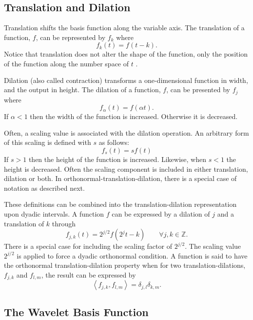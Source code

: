 \subsection {Translation and Dilation}

Translation shifts the basis function along the variable axis. The translation of a function, $f$, can be represented by $f_k$ where
\[
f_k(t) = f(t-k).
\]
Notice that translation does not alter the shape of the function, only the position of the function along the number space of $t$ \cite{translation}.

Dilation (also called contraction) transforms a one-dimensional function in width, and the output in height.   The dilation of a function, $f$, can be presented by $f_{j}$ where
\[
f_\alpha(t) = f(\alpha t).
\]
If $\alpha<1$ then the width of the function is increased. Otherwise it is decreased. 

Often, a scaling value is associated with the dilation operation.  An arbitrary form of this scaling is defined with $s$ as follows:
\[
f_s (t) = s f(t) 
\]
If $s>1$ then the height of the function is increased.   Likewise, when $s<1$ the height is decreased.  Often the scaling component is included in either translation, dilation or both.  In orthonormal-translation-dilation, there is a special case of notation as described next. 

These definitions can be combined into the translation-dilation representation upon dyadic intervals. A function $f$ can be expressed by a dilation of $j$ and a translation of $k$ through
\[
f_{j,k}(t) = 2^{j/2}f(2^jt-k) \qquad \forall j, k \in {\mathbb Z}.
\]
There is a special case for including the scaling factor of $2^{j/2}$.  The scaling value $2^{j/2}$ is applied to force a dyadic orthonormal condition.  
A function is said to have the orthonormal translation-dilation property when for two translation-dilations, $f_{j,k}$ and $f_{l,m}$, the result can be expressed by \cite{ChuiIntro}
\[
\left< f_{j,k} , f_{l,m} \right> = \delta_{j,l} \delta_{k,m}.
\]

\subsection {The Wavelet Basis Function}

